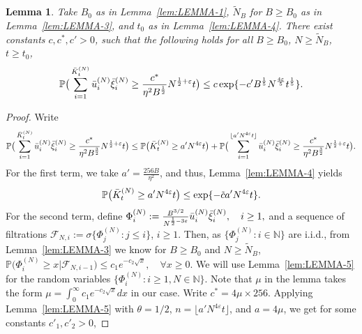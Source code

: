 \documentclass[11pt, reqno]{article}
\newtheorem{lemma}[theorem]{Lemma}
\numberwithin{equation}{section}
\numberwithin{theorem}{section}
\newcommand\blue[1]{#1}
\begin{document}
\begin{appendix}
\begin{lemma}\label{lemma 6}
Take $B_0$ as in Lemma~\ref{lem:LEMMA-1}, $\tilde N_B$ for $B \ge B_0$ as in Lemma~\ref{lem:LEMMA-3}, and $t_0$ as in Lemma~\ref{lem:LEMMA-4}.
There exist constants $c, c^{*}, c'>0$, such that the following holds for all $B\geq B_0$, $N\geq \tilde N_B $, $t\geq t_0$,
$$\mathbb{P}\big(\sum_{i=1}^{\bar{K}^{(N)}_{t}}\Bar{u}^{(N)}_i\Bar{\xi}^{(N)}_i\geq \frac{c^{*}}{\eta^2B^{\frac{1}{2}}}N^{\frac{1}{2}+\varepsilon}t\big)\leq c\exp \{-c'B^{\frac{1}{5}}N^{\frac{4\varepsilon}{5}}t^{\frac{1}{5}}\}.$$
\end{lemma}
\begin{proof}
Write
\begin{equation}\label{eq:lem4.6-1}
    \mathbb{P}\big(\sum_{i=1}^{\bar{K}^{(N)}_t}\Bar{u}^{(N)}_i\Bar{\xi}^{(N)}_i\geq \frac{c^{*}}{\eta^2B^{\frac{3}{2}}}N^{\frac{1}{2}+\varepsilon}t \big)
\leq  \mathbb{P}\big(\bar{K}^{(N)}_t\geq a'N^{4\varepsilon}t\big) + \mathbb{P}\big(\sum_{i=1}^{\lfloor a'N^{4\varepsilon}t\rfloor}\Bar{u}^{(N)}_i\Bar{\xi}^{(N)}_i\geq \frac{c^{*}}{\eta^2B^{\frac{3}{2}}}N^{\frac{1}{2}+\varepsilon}t\big).
\end{equation}
For the first term, we take $a'=\frac{256B}{\eta^2}$, and thus, Lemma~\ref{lem:LEMMA-4} yields
\begin{equation}
    \label{eq:lem4.6-2}
    \mathbb{P}\big(\bar{K}^{(N)}_t\geq a'N^{4\varepsilon}t\big) \leq \exp \{-\Tilde{c}a'N^{4\varepsilon}t\}.
\end{equation}
For the second term, define 
$\Phi_i^{(N)}:= \frac{B^{3/2}}{N^{\frac{1}{2}- 3\varepsilon}}\Bar{u}^{(N)}_i\Bar{\xi}^{(N)}_i, \quad i\geq 1,$
and a sequence of filtrations $\mathcal{F}_{N,i} :=\sigma\{\Phi_j^{(N)} : j \le i\}$, $i\geq 1$.
Then, as $\{\Phi_j^{(N)} : i \in \mathbb{N}\}$ are i.i.d., from Lemma~\ref{lem:LEMMA-3} we know for $B\geq B_0$ and $N\geq \tilde N_B$,
$
\mathbb{P}\big(\Phi_i^{(N)}\geq x|\mathcal{F}_{N,i-1}\big)\leq c_1e^{-c_2\sqrt{x}},\quad\forall x\geq 0.
$
We will use Lemma~\ref{lem:LEMMA-5} for the random variables $\{\Phi_i^{(N)} : i \ge 1, N \in \mathbb{N}\}$. Note that $\mu$ in the lemma takes the form $\mu = \int_0^{\infty}c_1e^{-c_2\sqrt{x}}dx$ in our case. Write $c^*= 4\mu \times 256$. Applying Lemma~\ref{lem:LEMMA-5} with $\theta = 1/2$, $n = \lfloor a'N^{4\varepsilon}t\rfloor$, and $a = 4\mu$, we get for some constants $c'_1, c'_2>0$,

\end{proof}
\end{appendix}
\end{document}
